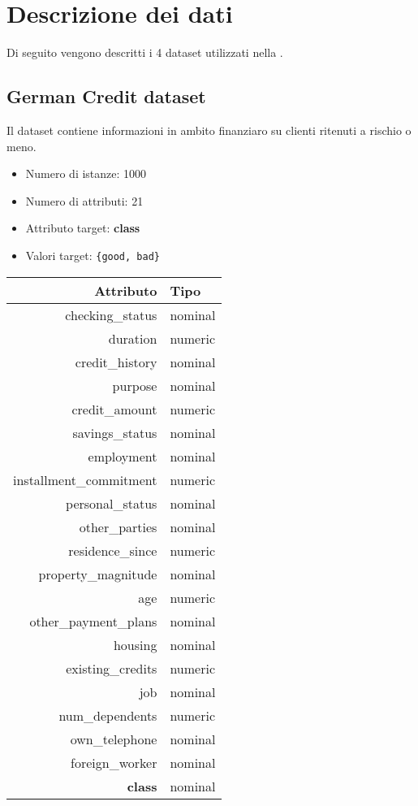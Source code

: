 \chapter{Descrizione dei dati}
\label{ch:data}

Di seguito vengono descritti i 4 dataset utilizzati nella .

\section{German Credit dataset}
Il dataset contiene informazioni in ambito finanziaro su clienti ritenuti a rischio o meno.

\begin{itemize}
	\item Numero di istanze: 1000
	\item Numero di attributi: 21
	\item Attributo target: \textbf{class}
	\item Valori target: \texttt{\{good, bad\}}
\end{itemize}

\begin{table}[!htb]
	\centering
	\begin{tabular}{|r|l|}
		\hline
		Attributo & Tipo \\
		\hline
		checking\_status & nominal \\
		duration & numeric \\
		credit\_history & nominal \\
		purpose & nominal \\
		credit\_amount & numeric \\
		savings\_status & nominal \\
		employment & nominal \\
		installment\_commitment & numeric \\
		personal\_status & nominal \\
		other\_parties & nominal \\
		residence\_since & numeric \\
		property\_magnitude & nominal \\
		age & numeric \\
		other\_payment\_plans & nominal \\
		housing & nominal \\
		existing\_credits & numeric \\
		job & nominal \\
		num\_dependents & numeric \\
		own\_telephone & nominal \\
		foreign\_worker & nominal \\
		\textbf{class} & nominal \\
		\hline
	\end{tabular}
\end{table}

